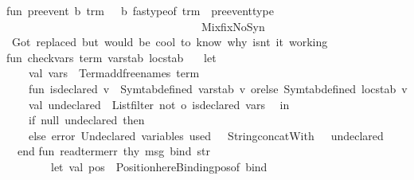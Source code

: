 \begin{isabellebody}
\isanewline
fun\ pre{\isacharunderscore}{\kern0pt}event\ {\isacharparenleft}{\kern0pt}b{\isacharcomma}{\kern0pt}\ trm{\isacharcomma}{\kern0pt}\ {\isacharunderscore}{\kern0pt}{\isacharparenright}{\kern0pt}\ {\isacharequal}{\kern0pt}\ {\isacharparenleft}{\kern0pt}b{\isacharcomma}{\kern0pt}\ fastype{\isacharunderscore}{\kern0pt}of\ trm\ {\isacharminus}{\kern0pt}{\isacharminus}{\kern0pt}{\isachargreater}{\kern0pt}\ pre{\isacharunderscore}{\kern0pt}event{\isacharunderscore}{\kern0pt}type{\isacharcomma}{\kern0pt}\ \isanewline
\ \ \ \ \ \ \ \ \ \ \ \ \ \ \ \ \ \ \ \ \ \ \ \ \ \ \ \ \ \ \ \ \ \ \ Mixfix{\isachardot}{\kern0pt}NoSyn{\isacharparenright}{\kern0pt}\ \ \isanewline
\isanewline
\isanewline
{\isacharparenleft}{\kern0pt}{\isacharasterisk}{\kern0pt}\ Got\ replaced\ but\ would\ be\ cool\ to\ know\ why\ isn{\isacharprime}{\kern0pt}t\ it\ working\isanewline
\isanewline
fun\ check{\isacharunderscore}{\kern0pt}vars\ term\ varstab\ locstab\ {\isacharequal}{\kern0pt}\isanewline
\ \ let\isanewline
\ \ \ \ val\ vars\ {\isacharequal}{\kern0pt}\ Term{\isachardot}{\kern0pt}add{\isacharunderscore}{\kern0pt}free{\isacharunderscore}{\kern0pt}names\ term\ {\isacharbrackleft}{\kern0pt}{\isacharbrackright}{\kern0pt}\isanewline
\ \ \ \ fun\ is{\isacharunderscore}{\kern0pt}declared\ v\ {\isacharequal}{\kern0pt}\ Symtab{\isachardot}{\kern0pt}defined\ varstab\ v\ orelse\ Symtab{\isachardot}{\kern0pt}defined\ locstab\ v\isanewline
\ \ \ \ val\ undeclared\ {\isacharequal}{\kern0pt}\ List{\isachardot}{\kern0pt}filter\ {\isacharparenleft}{\kern0pt}not\ o\ is{\isacharunderscore}{\kern0pt}declared{\isacharparenright}{\kern0pt}\ vars\isanewline
\ \ in\isanewline
\ \ \ \ if\ null\ undeclared\ then\ {\isacharparenleft}{\kern0pt}{\isacharparenright}{\kern0pt}\isanewline
\ \ \ \ else\ error\ {\isacharparenleft}{\kern0pt}{\isachardoublequote}{\kern0pt}Undeclared\ variable{\isacharparenleft}{\kern0pt}s{\isacharparenright}{\kern0pt}\ used{\isacharcolon}{\kern0pt}\ {\isachardoublequote}{\kern0pt}\ {\isacharcircum}{\kern0pt}\ String{\isachardot}{\kern0pt}concatWith\ {\isachardoublequote}{\kern0pt}{\isacharcomma}{\kern0pt}\ {\isachardoublequote}{\kern0pt}\ undeclared{\isacharparenright}{\kern0pt}\isanewline
\ \ end{\isacharasterisk}{\kern0pt}{\isacharparenright}{\kern0pt}\isanewline
\isanewline
\isanewline
fun\ read{\isacharunderscore}{\kern0pt}term{\isacharunderscore}{\kern0pt}err\ thy\ msg\ bind\ str\ {\isacharequal}{\kern0pt}\ \isanewline
\ \ \ \ \ \ \ \ let\ val\ pos\ {\isacharequal}{\kern0pt}\ Position{\isachardot}{\kern0pt}here{\isacharparenleft}{\kern0pt}Binding{\isachardot}{\kern0pt}pos{\isacharunderscore}{\kern0pt}of\ bind{\isacharparenright}{\kern0pt}\isanewline

\end{isabellebody}
